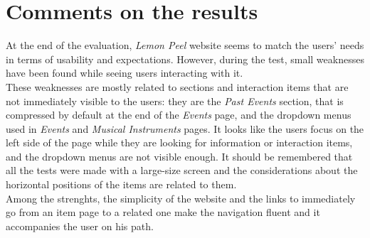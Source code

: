 \documentclass[../../UsabilityReport.tex]{subfiles}
\begin{document}
\section{Comments on the results}
	At the end of the evaluation, \textit{Lemon Peel} website seems to match the users' needs in terms of usability and expectations. However, during the test, small weaknesses have been found while seeing users interacting with it.\\
	These weaknesses are mostly related to sections and interaction items that are not immediately visible to the users: they are the \textit{Past Events} section, that is compressed by default at the end of the \textit{Events} page, and the dropdown menus used in \textit{Events} and \textit{Musical Instruments} pages. It looks like the users focus on the left side of the page while they are looking for information or interaction items, and the dropdown menus are not visible enough. It should be remembered that all the tests were made with a large-size screen and the considerations about the horizontal positions of the items are related to them.\\
	Among the strenghts, the simplicity of the website and the links to immediately go from an item page to a related one make the navigation fluent and it accompanies the user on his path.
\end{document}
